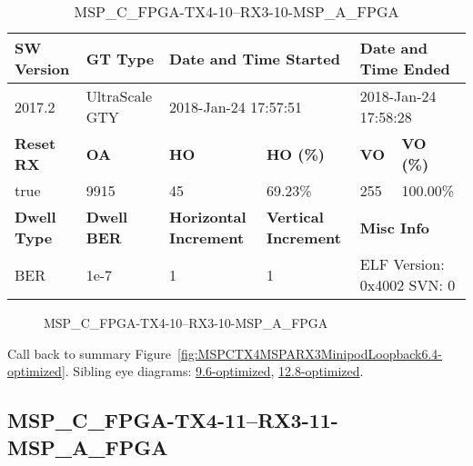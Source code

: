 \begin{table}[h]
\centering
\caption{MSP\_C\_FPGA-TX4-10--RX3-10-MSP\_A\_FPGA}
\label{tab:MSPCFPGATX410RX310MSPAFPGA6.4-optimized}
\begin{tabular}{@{}|l|l|l|l|l|l|@{}}
\toprule
\textbf{SW Version}                & \textbf{GT Type}   & \multicolumn{2}{l|}{\textbf{Date and Time Started}}            & \multicolumn{2}{l|}{\textbf{Date and Time Ended}}        \\ \midrule
2017.2                       & UltraScale GTY          & \multicolumn{2}{l|}{2018-Jan-24 17:57:51}                   & \multicolumn{2}{l|}{2018-Jan-24 17:58:28}               \\ \midrule
\textbf{Reset RX}                  & \textbf{OA} & \textbf{HO}   & \textbf{HO (\%)} & \textbf{VO} & \textbf{VO (\%)} \\ \midrule
true & 9915        & 45          & 69.23\%        & 255        & 100.00\%       \\ \midrule
\textbf{Dwell Type}                & \textbf{Dwell BER} & \textbf{Horizontal Increment} & \textbf{Vertical Increment}    & \multicolumn{2}{l|}{\textbf{Misc Info}}                  \\ \midrule
BER                            & 1e-7        & 1        & 1           & \multicolumn{2}{l|}{ELF Version: 0x4002 SVN: 0}                         \\ \bottomrule
\end{tabular}
\end{table}

\begin{figure}[h]
\caption{MSP\_C\_FPGA-TX4-10--RX3-10-MSP\_A\_FPGA} \label{fig:MSPCFPGATX410RX310MSPAFPGA6.4-optimized}
\end{figure}

Call back to summary Figure~\ref{fig:MSPCTX4MSPARX3MinipodLoopback6.4-optimized}.
Sibling eye diagrams: \hyperref[sec:MSPCFPGATX410RX310MSPAFPGA9.6-optimized]{9.6-optimized}, \hyperref[sec:MSPCFPGATX410RX310MSPAFPGA12.8-optimized]{12.8-optimized}.

\clearpage
\newpage


\subsection{MSP\_C\_FPGA-TX4-11--RX3-11-MSP\_A\_FPGA}\label{sec:MSPCFPGATX411RX311MSPAFPGA6.4-optimized}

